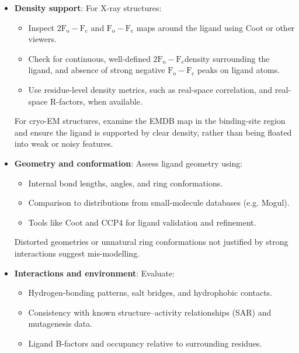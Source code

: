 \documentclass[12pt]{article}
\begin{document}
\begin{itemize}
\item \textbf{Density support}: For X-ray structures:
\begin{itemize}
  \item Inspect 2$\textrm{F}_\textrm{o}-\textrm{F}_\textrm{c}$ and $\textrm{F}_\textrm{o}-\textrm{F}_\textrm{c}$ maps around the ligand using Coot\cite{CH4_Emsley2010_Coot} or other viewers.
  \item Check for continuous, well-defined 2$\textrm{F}_\textrm{o}-\textrm{F}_\textrm{c}$density surrounding the ligand, and absence of strong negative $\textrm{F}_\textrm{o}-\textrm{F}_\textrm{c}$ peaks on ligand atoms.
  \item Use residue-level density metrics, such as real-space correlation, and real-space R-factors, when available.\cite{CH4_karplus2012linking,CH4_Joosten2014_PDBREDO}
\end{itemize}

For cryo-EM structures, examine the EMDB map in the binding-site region and ensure the ligand is supported by clear density, rather than being floated into weak or noisy features.\cite{CH4_pintilie2021validation}

\item \textbf{Geometry and conformation}: Assess ligand geometry using:
\begin{itemize}
  \item Internal bond lengths, angles, and ring conformations.
  \item Comparison to distributions from small-molecule databases (e.g. Mogul)\cite{CH4_bruno2004retrieval}.
  \item Tools like Coot and CCP4 for ligand validation and refinement\cite{CH4_emsley2017tools,CH4_nicholls2017ligand}.
\end{itemize}
Distorted geometries or unnatural ring conformations not justified by strong interactions suggest mis-modelling.

\item \textbf{Interactions and environment}: Evaluate:
\begin{itemize}
  \item Hydrogen-bonding patterns, salt bridges, and hydrophobic contacts.
  \item Consistency with known structure--activity relationships (SAR) and mutagenesis data.
  \item Ligand B-factors and occupancy relative to surrounding residues.
\end{itemize}


\end{itemize}
\end{document}
